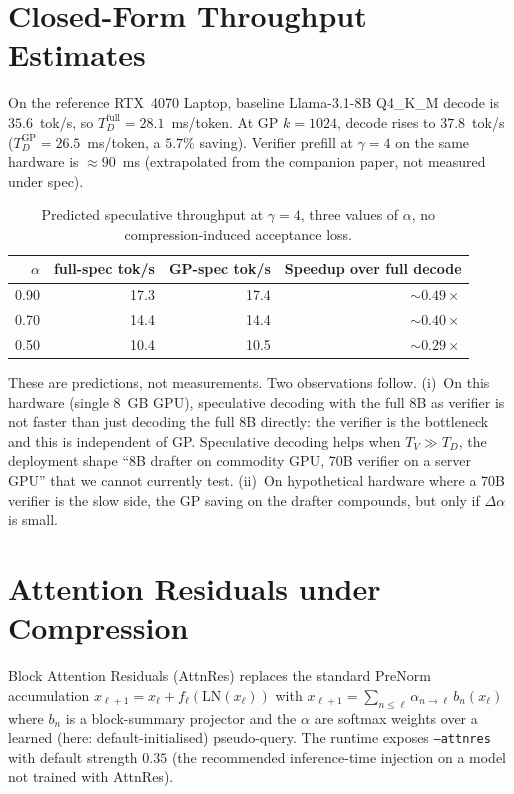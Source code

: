 \documentclass[11pt]{article}
\begin{document}
\section{Closed-Form Throughput Estimates}
\label{sec:closedform}
On the reference RTX~4070 Laptop, baseline Llama-3.1-8B Q4\_K\_M decode
is $35.6$~tok/s, so $T_D^\text{full}{=}28.1$~ms/token.  At GP
$k{=}1024$, decode rises to $37.8$~tok/s
($T_D^\text{GP}{=}26.5$~ms/token, a $5.7\%$ saving).  Verifier prefill
at $\gamma{=}4$ on the same hardware is $\approx 90$~ms (extrapolated
from the companion paper, not measured under spec).

\begin{table}[h]\centering\small
\caption{Predicted speculative throughput at $\gamma{=}4$, three values
of $\alpha$, no compression-induced acceptance loss.}
\begin{tabular}{@{}rrrr@{}}
\toprule
$\alpha$ & full-spec tok/s & GP-spec tok/s & Speedup over full decode \\
\midrule
0.90 & 17.3 & 17.4 & $\sim 0.49\times$ \\
0.70 & 14.4 & 14.4 & $\sim 0.40\times$ \\
0.50 & 10.4 & 10.5 & $\sim 0.29\times$ \\
\bottomrule
\end{tabular}
\end{table}

These are predictions, not measurements.  Two observations follow.
(i)~On this hardware (single 8~GB GPU), speculative decoding with
the full 8B as verifier is not faster than just decoding the full
8B directly: the verifier is the bottleneck and this is independent of
GP.  Speculative decoding helps when $T_V\gg T_D$, the deployment shape
``8B drafter on commodity GPU, 70B verifier on a server GPU'' that we
cannot currently test.  (ii)~On hypothetical hardware where a 70B
verifier is the slow side, the GP saving on the drafter compounds, but
only if $\Delta\alpha$ is small.

\section{Attention Residuals under Compression}
\label{sec:attnres}
Block Attention Residuals (AttnRes) replaces the standard PreNorm
accumulation $x_{\ell+1}=x_\ell+f_\ell(\mathrm{LN}(x_\ell))$ with
\(x_{\ell+1}=\sum_{n\leq\ell}\alpha_{n\to\ell}\,b_n(x_\ell)\) where $b_n$
is a block-summary projector and the $\alpha$ are softmax weights over a
learned (here: default-initialised) pseudo-query.  The runtime exposes
\texttt{--attnres} with default strength $0.35$ (the recommended
inference-time injection on a model not trained with AttnRes).
\end{document}
